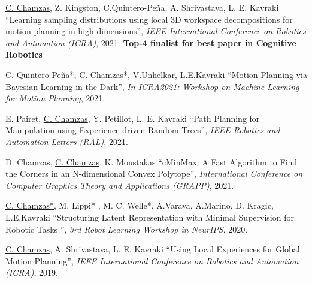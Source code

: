 \documentclass[letterpaper,11pt]{article}
\begin{document}
\begin{thebibliography}{9}
    \underline{C. Chamzas}, Z. Kingston, C.Quintero-Peña, A. Shrivastava, L. E. Kavraki
	``Learning sampling distributions using local 3D workspace decompositions for motion planning in high dimensions'',
    \textit{IEEE International Conference on Robotics and Automation (ICRA)}, 2021.
    \textbf{Top-4 finalist for best paper in Cognitive Robotics} 

     C. Quintero-Peña*, \underline{C. Chamzas*}, V.Unhelkar, L.E.Kavraki
	``Motion Planning via Bayesian Learning in the Dark'',
    \textit{In ICRA2021: Workshop on Machine Learning for Motion Planning}, 2021.  

	E. Pairet, \underline{C. Chamzas}, Y. Petillot, L. E. Kavraki
	``Path Planning for Manipulation using Experience-driven Random Trees'',
    \textit{IEEE Robotics and Automation Letters (RAL)}, 2021.
	
	D. Chamzas, \underline{C. Chamzas}, K. Moustakas
	``cMinMax: A Fast Algorithm to Find the Corners in an N-dimensional Convex Polytope'',
    \textit{International Conference on Computer Graphics Theory and Applications (GRAPP)}, 2021. 

	\underline{C. Chamzas*}, M. Lippi* , M. C. Welle*, A.Varava, A.Marino, D. Kragic, L.E.Kavraki
    ``Structuring Latent Representation with Minimal Supervision for Robotic Tasks '',
    \textit{3rd Robot Learning Workshop in NeurIPS}, 2020. 

	\underline{C. Chamzas}, A. Shrivastava, L. E. Kavraki
	``Using Local Experiences for Global Motion Planning'',
    \textit{IEEE International Conference on Robotics and Automation (ICRA)}, 2019.
   
	\end{thebibliography}
	\endgroup
\end{document}
